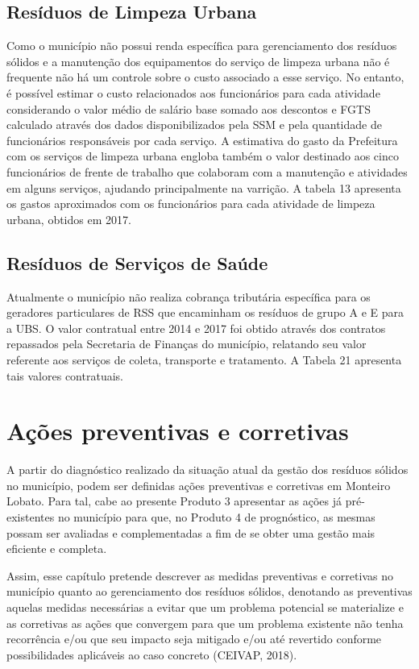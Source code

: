 	\subsection{Resíduos de Limpeza Urbana}
	Como o município não possui renda específica para gerenciamento dos resíduos sólidos e a manutenção dos equipamentos do serviço de limpeza urbana não é frequente não há um controle sobre o custo associado a esse serviço. No entanto, é possível estimar o custo relacionados aos funcionários para cada atividade considerando o valor médio de salário base somado aos descontos e FGTS calculado através dos dados disponibilizados pela SSM e pela quantidade de funcionários responsáveis por cada serviço. A estimativa do gasto da Prefeitura com os serviços de limpeza urbana engloba também o valor destinado aos cinco funcionários de frente de trabalho que colaboram com a manutenção e atividades em alguns serviços, ajudando principalmente na varrição.  A tabela 13 apresenta os gastos aproximados com os funcionários para cada atividade de limpeza urbana, obtidos em 2017.
	
	
	
	\subsection{Resíduos de Serviços de Saúde}
	Atualmente o município não realiza cobrança tributária específica para os geradores particulares de RSS que encaminham os resíduos de grupo A e E para a UBS.
	O valor contratual entre 2014 e 2017 foi obtido através dos contratos repassados pela Secretaria de Finanças do município, relatando seu valor referente aos serviços de coleta, transporte e tratamento. A Tabela 21 apresenta tais valores contratuais.
	
	
	
	
\section{Ações preventivas e corretivas}
A partir do diagnóstico realizado da situação atual da gestão dos resíduos sólidos no município, podem ser definidas ações preventivas e corretivas em Monteiro Lobato. Para tal, cabe ao presente Produto 3 apresentar as ações já pré-existentes no município para que, no Produto 4 de prognóstico, as mesmas possam ser avaliadas e complementadas a fim de se obter uma gestão mais eficiente e completa.

Assim, esse capítulo pretende descrever as medidas preventivas e corretivas no município quanto ao gerenciamento dos resíduos sólidos, denotando as preventivas aquelas medidas necessárias a evitar que um problema potencial se materialize e as corretivas as ações que convergem para que um problema existente não tenha recorrência e/ou que seu impacto seja mitigado e/ou até revertido conforme possibilidades aplicáveis ao caso concreto (CEIVAP, 2018).

